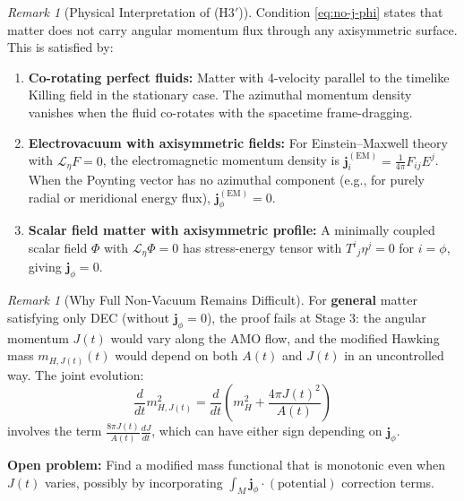 \documentclass[12pt]{article}
\theoremstyle{plain}
\theoremstyle{definition}
\theoremstyle{remark}
\newtheorem{remark}[theorem]{Remark}
\newcommand{\momdens}{\boldsymbol{j}}
\begin{document}
\begin{remark}[Physical Interpretation of (H3$'$)]\label{rem:h3prime-physics}
Condition \eqref{eq:no-j-phi} states that matter does not carry angular momentum flux through any axisymmetric surface. This is satisfied by:
\begin{enumerate}
    \item \textbf{Co-rotating perfect fluids:} Matter with 4-velocity parallel to the timelike Killing field in the stationary case. The azimuthal momentum density vanishes when the fluid co-rotates with the spacetime frame-dragging.
    
    \item \textbf{Electrovacuum with axisymmetric fields:} For Einstein--Maxwell theory with $\mathcal{L}_\eta F = 0$, the electromagnetic momentum density is $\momdens^{(\mathrm{EM})}_i = \frac{1}{4\pi}F_{ij}E^j$. When the Poynting vector has no azimuthal component (e.g., for purely radial or meridional energy flux), $\momdens^{(\mathrm{EM})}_\phi = 0$.
    
    \item \textbf{Scalar field matter with axisymmetric profile:} A minimally coupled scalar field $\Phi$ with $\mathcal{L}_\eta \Phi = 0$ has stress-energy tensor with $T^i{}_j\eta^j = 0$ for $i = \phi$, giving $\momdens_\phi = 0$.
\end{enumerate}
\end{remark}

\begin{remark}[Why Full Non-Vacuum Remains Difficult]\label{rem:full-nonvacuum}
For \textbf{general} matter satisfying only DEC (without $\momdens_\phi = 0$), the proof fails at Stage 3: the angular momentum $J(t)$ would vary along the AMO flow, and the modified Hawking mass $m_{H,J(t)}(t)$ would depend on both $A(t)$ and $J(t)$ in an uncontrolled way. The joint evolution:
\[
\frac{d}{dt}m_{H,J(t)}^2 = \frac{d}{dt}\left(m_H^2 + \frac{4\pi J(t)^2}{A(t)}\right)
\]
involves the term $\frac{8\pi J(t)}{A(t)}\frac{dJ}{dt}$, which can have either sign depending on $\momdens_\phi$.

\textbf{Open problem:} Find a modified mass functional that is monotonic even when $J(t)$ varies, possibly by incorporating $\int_M \momdens_\phi \cdot (\text{potential})$ correction terms.
\end{remark}
\end{document}
